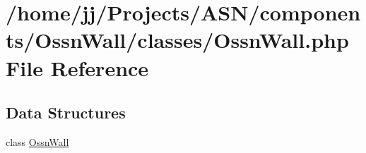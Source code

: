 \hypertarget{_ossn_wall_8php}{}\section{/home/jj/\+Projects/\+A\+S\+N/components/\+Ossn\+Wall/classes/\+Ossn\+Wall.php File Reference}
\label{_ossn_wall_8php}
\subsection*{Data Structures}
\begin{DoxyCompactItemize}
\item 
class \hyperlink{class_ossn_wall}{Ossn\+Wall}
\end{DoxyCompactItemize}
